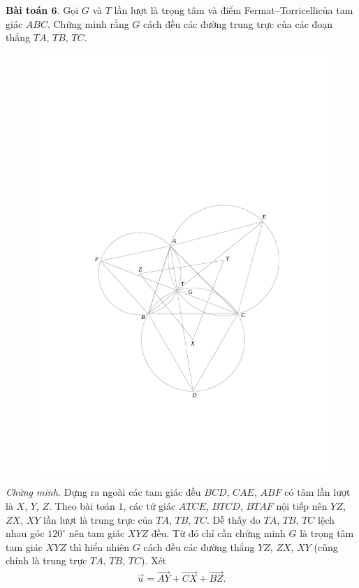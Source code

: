 \begin{multicols}{2}
	\vskip 0.1cm
	\textbf{\color{cackithi}Bài toán $\pmb{6.}$} Gọi $G$ và $T$ lần lượt là trọng tâm và điểm Fermat--Torricellicủa tam giác $ABC$. Chứng minh rằng $G$ cách đều các đường trung trực của các đoạn thẳng $TA$, $TB$, $TC$.
	\begin{figure}[H]
		\vspace*{-5pt}
		\centering
		\captionsetup{labelformat= empty, justification=centering}
		\includegraphics[width= 0.8\linewidth]{figure7794}
		\vspace*{-10pt}
	\end{figure}
	\textit{Chứng minh.} Dựng ra ngoài các tam giác đều $BCD$, $CAE$, $ABF$ có tâm lần lượt là $X$, $Y$, $Z$. Theo bài toán $1$, các tứ giác $ATCE$, $BTCD$, $BTAF$ nội tiếp nên $YZ$, $ZX$, $XY$ lần lượt là trung trực của $TA$, $TB$, $TC$. Dễ thấy do $TA$, $TB$, $TC$ lệch nhau góc $120^\circ$ nên tam giác $XYZ$ đều. Từ đó chỉ cần chứng minh $G$ là trọng tâm tam giác $XYZ$ thì hiển nhiên $G$ cách đều các đường thẳng $YZ$, $ZX$, $XY$ (cũng chính là trung trực $TA$, $TB$, $TC$). Xét 
	\begin{align*}
		\overrightarrow{u}=\overrightarrow{AY}+\overrightarrow{CX}+\overrightarrow{BZ}.
	\end{align*}

\end{multicols}
